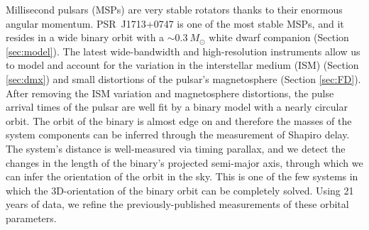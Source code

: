 Millisecond pulsars (MSPs) are very stable rotators thanks to their enormous angular momentum. PSR~J1713+0747 is one of the most stable MSPs, and it resides in a wide binary orbit with a $\sim0.3~M_{\odot}$ white dwarf companion (Section \ref{sec:model}). 
The latest wide-bandwidth and high-resolution instruments allow us to model and account for the variation in the interstellar medium (ISM)
(Section \ref{sec:dmx}) and small distortions of the pulsar's magnetosphere (Section \ref{sec:FD}). 
After removing the ISM variation and magnetosphere distortions, the
pulse arrival times of the pulsar are well fit by a binary model with
a nearly circular orbit.
The orbit of the binary is almost edge on and therefore the masses of
the system components can be inferred through the measurement of Shapiro delay. 
The system's distance is well-measured via timing parallax, and we detect the changes in the length of the binary's projected semi-major axis, through which we can infer the orientation of the orbit in the sky.
This is one of the few systems in which the 3D-orientation of the
binary orbit can be completely solved. Using 21 years of data, we
refine the previously-published measurements of these orbital
parameters.


